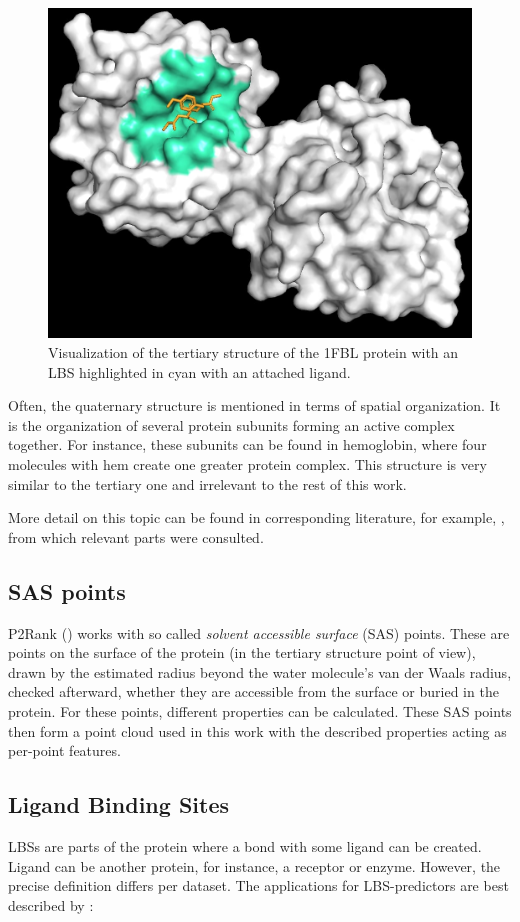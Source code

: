 \begin{figure}
    \centering
    \includegraphics[width=0.5\linewidth]{tertiary.png}
    \caption{Visualization of the tertiary structure of the 1FBL protein with an \ac{LBS} highlighted in cyan with an attached ligand.}
    \label{fig:tertiary}
\end{figure}

Often, the quaternary structure is mentioned in terms of spatial organization. It is the organization of several protein subunits forming an active complex together. For instance, these subunits can be found in hemoglobin, where four molecules with hem create one greater protein complex. This structure is very similar to the tertiary one and irrelevant to the rest of this work.

More detail on this topic can be found in corresponding literature, for example, \cite{kodicek}, from which relevant parts were consulted.

\subsection{SAS points}

P2Rank (\cite{P2RANK}) works with so called \textit{solvent accessible surface} (\ac{SAS}) points. These are points on the surface of the protein (in the tertiary structure point of view), drawn by the estimated radius beyond the water molecule's van der Waals radius, checked afterward, whether they are accessible from the surface or buried in the protein. For these points, different properties can be calculated. These SAS points then form a point cloud used in this work with the described properties acting as per-point features.

\subsection{Ligand Binding Sites}
\label{LBS}

LBSs are parts of the protein where a bond with some ligand can be created. Ligand can be another protein, for instance, a receptor or enzyme. However, the precise definition differs per dataset. The applications for LBS-predictors are best described by \cite{P2RANK}:

